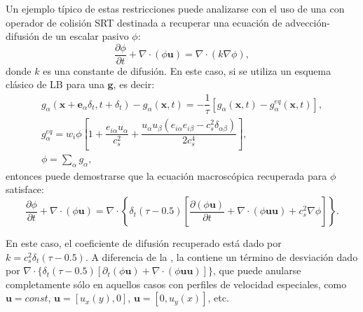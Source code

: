 Un ejemplo t\'ipico de estas restricciones puede analizarse con el uso de una \lbe{} con operador de colisi\'on SRT destinada a recuperar una ecuaci\'on de advecci\'on-difusi\'on de un escalar pasivo $\phi$:
\begin{equation}
	\dfrac{\partial \phi}{\partial t} + \nabla \cdot (\phi \bm{u}) = \nabla \cdot (k \nabla \phi),
	\label{eq:adv_dif_phi}
\end{equation}
donde $k$ es una constante de difusi\'on. En este caso, si se utiliza un esquema cl\'asico de LB para una \fdp{} $\bm{g}$, es decir:
\begin{equation}
	\begin{gathered}
		g_{\alpha}(\bm{x}+\bm{e}_{\alpha}\delta_t, t+\delta_t) - g_{\alpha}(\bm{x},t) = -\dfrac{1}{\tau} \left[ g_{\alpha}(\bm{x},t) - g^{eq}_{\alpha}(\bm{x},t) \right], \\[2mm]
		g_{\alpha}^{eq} = w_i \phi \left[ 1 + \dfrac{e_{i\alpha}u_{\alpha}}{c_s^2} + \dfrac{u_{\alpha}u_{\beta}(e_{i\alpha}e_{i\beta}-c_s^2\delta_{\alpha\beta})}{2c_s^4} \right], \\[2mm]
		\phi = \sum_{\alpha} g_{\alpha},
	\end{gathered}
\end{equation}
entonces puede demostrarse que la ecuaci\'on macrosc\'opica recuperada para $\phi$ satisface:
\begin{equation}
	\dfrac{\partial \phi}{\partial t} + \nabla \cdot (\phi \bm{u}) = \nabla \cdot \left\{ \delta_t(\tau - 0.5) \left[ \dfrac{\partial (\phi\bm{u})}{\partial t} + \nabla \cdot (\phi \bm{uu}) + c_s^2 \nabla \phi\right]\right\}.
	\label{eq:adv_dif_phi_rec}
\end{equation}

En este caso, el coeficiente de difusi\'on recuperado est\'a dado por $k=c_s^2 \delta_t(\tau-0.5)$. A diferencia de la , la  contiene un t\'ermino de desviaci\'on dado por $\nabla \cdot \{ \delta_t(\tau - 0.5) [ \partial_t (\phi\bm{u}) + \nabla \cdot (\phi \bm{uu}) ]\}$, que puede anularse completamente s\'olo en aquellos casos con perfiles de velocidad especiales, como $\bm{u}=const$, $\bm{u}=[u_x(y),0]$, $\bm{u}=[0,u_y(x)]$, etc. 

